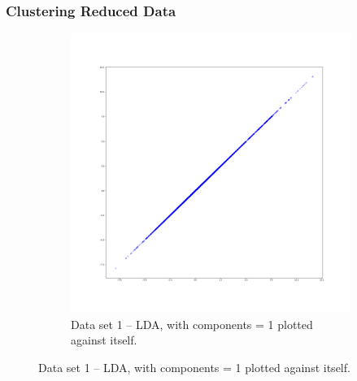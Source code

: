 \documentclass[
letterpaper, %
]{IEEEtran}
\begin{document}
	\subsubsection{Clustering Reduced Data}
	\begin{figure}[!b]
		\begin{subfigure}{1.0\linewidth}
			\centering
			\includegraphics[width=\linewidth]{./images/ds1/lda/scatter.png}
			\caption{Data set 1 -- LDA, with components = 1 plotted against itself.}
			\label{fig:ldascatter}
		\end{subfigure}
	\end{figure}
\end{document}
